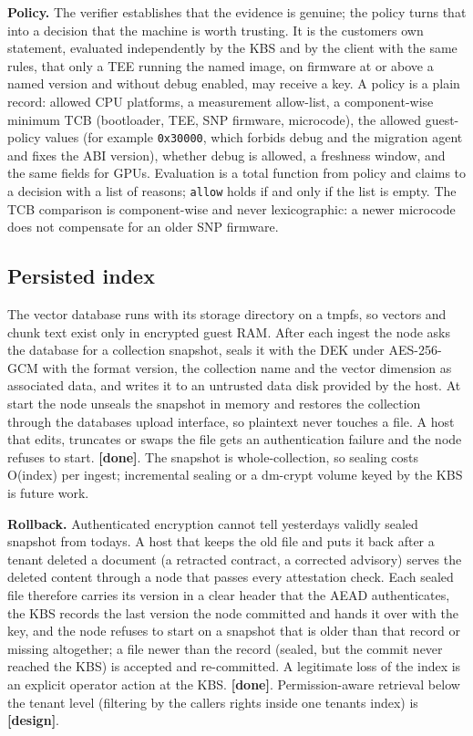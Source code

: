 \documentclass[letterpaper,twocolumn,10pt]{article}
\begin{document}
\textbf{Policy.} The verifier establishes that the evidence is genuine; the policy turns that into a decision that the machine is worth trusting. It is the customer\textquotesingle s own statement, evaluated independently by the KBS and by the client with the same rules, that only a TEE running the named image, on firmware at or above a named version and without debug enabled, may receive a key. A policy is a plain record: allowed CPU platforms, a measurement allow-list, a component-wise minimum TCB (bootloader, TEE, SNP firmware, microcode), the allowed guest-policy values (for example \texttt{0x30000}, which forbids debug and the migration agent and fixes the ABI version), whether debug is allowed, a freshness window, and the same fields for GPUs. Evaluation is a total function from policy and claims to a decision with a list of reasons; \texttt{allow} holds if and only if the list is empty. The TCB comparison is component-wise and never lexicographic: a newer microcode does not compensate for an older SNP firmware.

\subsection{Persisted index}\label{persisted-index}

The vector database runs with its storage directory on a tmpfs, so vectors and chunk text exist only in encrypted guest RAM. After each ingest the node asks the database for a collection snapshot, seals it with the DEK under AES-256-GCM with the format version, the collection name and the vector dimension as associated data, and writes it to an untrusted data disk provided by the host. At start the node unseals the snapshot in memory and restores the collection through the database\textquotesingle s upload interface, so plaintext never touches a file. A host that edits, truncates or swaps the file gets an authentication failure and the node refuses to start. \textbf{{[}done{]}}. The snapshot is whole-collection, so sealing costs O(index) per ingest; incremental sealing or a dm-crypt volume keyed by the KBS is future work.

\textbf{Rollback.} Authenticated encryption cannot tell yesterday\textquotesingle s validly sealed snapshot from today\textquotesingle s. A host that keeps the old file and puts it back after a tenant deleted a document (a retracted contract, a corrected advisory) serves the deleted content through a node that passes every attestation check. Each sealed file therefore carries its version in a clear header that the AEAD authenticates, the KBS records the last version the node committed and hands it over with the key, and the node refuses to start on a snapshot that is older than that record or missing altogether; a file newer than the record (sealed, but the commit never reached the KBS) is accepted and re-committed. A legitimate loss of the index is an explicit operator action at the KBS. \textbf{{[}done{]}}. Permission-aware retrieval below the tenant level (filtering by the caller\textquotesingle s rights inside one tenant\textquotesingle s index) is \textbf{{[}design{]}}.
\end{document}
